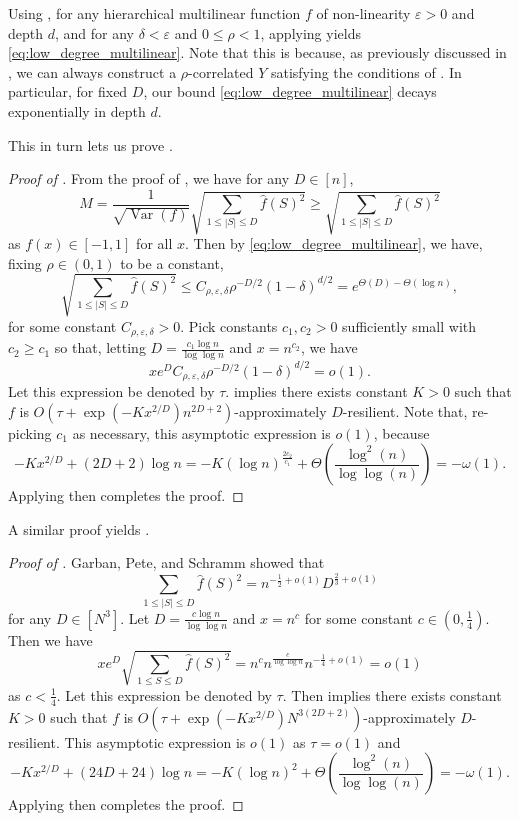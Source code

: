 \documentclass[12pt,letterpaper]{amsart}
\def\Var{\operatorname{Var}}
\newcommand{\abs}[1]{\left\lvert#1\right\rvert}
\newcommand{\paren}[1]{\left(#1\right)}
\newcommand{\bracket}[1]{\left[#1\right]}
\newcommand{\1}[1]{1_{\left\{#1\right\}}}
\theoremstyle{definition}
\theoremstyle{remark}
\begin{document}
Using , for any hierarchical multilinear function $f$ of non-linearity $\varepsilon>0$ and depth $d$, and for any $\delta<\varepsilon$ and $0 \leq \rho < 1$, applying  yields \eqref{eq:low_degree_multilinear}.
Note that this is because, as previously discussed in , we can always construct a $\rho$-correlated $Y$ satisfying the conditions of .
In particular, for fixed $D$, our bound \eqref{eq:low_degree_multilinear} decays exponentially in depth $d$.

This in turn lets us prove .
\begin{proof}[Proof of ]
    From the proof of , we have for any $D\in[n]$,
    \[ M = \frac{1}{\sqrt{\Var(f)}}\sqrt{\sum_{1\leq\abs{S}\leq D}\widehat f(S)^2} \geq \sqrt{\sum_{1\leq\abs{S}\leq D}\widehat f(S)^2} \]
    as $f(x)\in[-1,1]$ for all $x$.
    Then by \eqref{eq:low_degree_multilinear}, we have, fixing $\rho\in(0,1)$ to be a constant,
    \[ \sqrt{\sum_{1\leq\abs{S}\leq D}\widehat f(S)^2} \leq C_{\rho,\varepsilon,\delta} \rho^{-D/2}(1-\delta)^{d/2} = e^{\Theta(D)-\Theta(\log n)}, \]
    for some constant $C_{\rho,\varepsilon,\delta}>0$.
    Pick constants $c_1,c_2>0$ sufficiently small with $c_2\geq c_1$ so that, letting $D=\frac{c_1\log n}{\log\log n}$ and $x=n^{c_2}$, we have
    \[ xe^D C_{\rho,\varepsilon,\delta} \rho^{-D/2}(1-\delta)^{d/2} = o(1). \]
    Let this expression be denoted by $\tau$.
    \cite[Theorem 3.2]{dachman2014approximate} implies there exists constant $K>0$ such that $f$ is $O\paren{\tau+\exp\paren{-Kx^{2/D}}n^{2D+2}}$-approximately $D$-resilient.
    Note that, re-picking $c_1$ as necessary, this asymptotic expression is $o(1)$, because
    \[ -Kx^{2/D}+(2D+2)\log n= -K(\log n)^{\frac{2c_2}{c_1}}+\Theta\paren{\frac{\log^2(n)}{\log\log(n)}} =-\omega(1). \]
    Applying \cite[Theorem 1.1]{dachman2014approximate} then completes the proof.
\end{proof}
A similar proof yields .
\begin{proof}[Proof of ]
    Garban, Pete, and Schramm \cite{garban2010fourier}
    showed that
    \[ \sum_{1\leq\abs{S}\leq D}\widehat f(S)^2 = n^{-\frac{1}{2}+o(1)}D^{\frac{2}{3}+o(1)} \]
    for any $D\in\bracket{N^3}$.
    Let $D=\frac{c\log n}{\log\log n}$ and $x=n^c$ for some constant $c\in\paren{0,\frac{1}{4}}$.
    Then we have
    \[ xe^D\sqrt{\sum_{1\leq S\leq D}\widehat f(S)^2}=n^cn^{\frac{c}{\log\log n}}n^{-\frac{1}{4}+o(1)}=o(1) \]
    as $c<\frac{1}{4}$.
    Let this expression be denoted by $\tau$.
    Then \cite[Theorem 3.2]{dachman2014approximate} implies there exists constant $K>0$ such that $f$ is $O\paren{\tau+\exp\paren{-Kx^{2/D}}N^{3(2D+2)}}$-approximately $D$-resilient.
    This asymptotic expression is $o(1)$ as $\tau=o(1)$ and
    \[ -Kx^{2/D}+(24D+24)\log n = -K(\log n)^2 + \Theta\paren{\frac{\log^2(n)}{\log\log(n)}}=-\omega(1). \]
    Applying \cite[Theorem 1.1]{dachman2014approximate} then completes the proof.
\end{proof}
\end{document}
